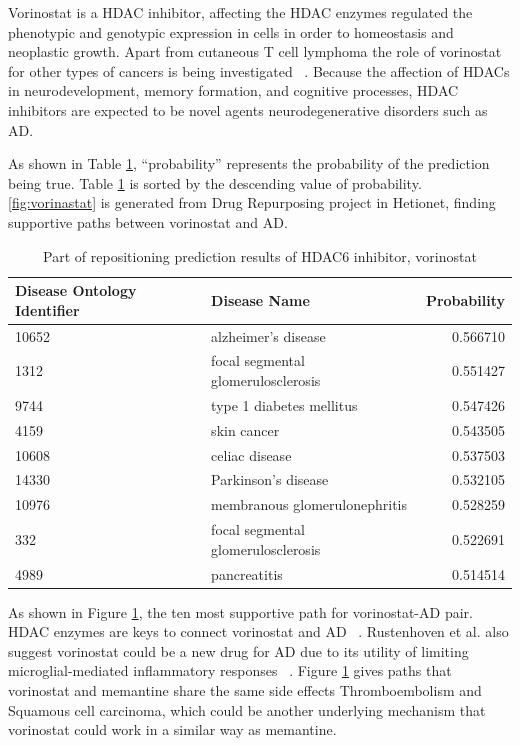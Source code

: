 Vorinostat is a \ac{HDAC} inhibitor, affecting the \ac{HDAC} enzymes regulated the phenotypic and genotypic expression in cells in order to homeostasis and neoplastic growth. Apart from cutaneous T cell lymphoma the role of vorinostat for other types of cancers is being investigated ~\cite{bubna_vorinostat-overview_2015}. Because the affection of \ac{HDAC}s in neurodevelopment, memory formation, and cognitive processes, \ac{HDAC} inhibitors are expected to be novel agents neurodegenerative disorders such as \ac{AD}.

As shown in Table \ref{tab:vorinostat}, “probability” represents the probability of the prediction being true. Table \ref{tab:vorinostat} is sorted by the descending value of probability. \ref{fig:vorinastat} is generated from Drug Repurposing project in Hetionet, finding supportive paths between vorinostat and \ac{AD}.

\begin{table}[!ht]
    \centering
    \begin{tabular}{|p{4cm}|l|r|}
        \hline
        \textbf{Disease Ontology Identifier} & \textbf{Disease Name} & \textbf{Probability}\\
        \hline
        10652 & alzheimer's disease & 0.566710 \\
        \hline
        1312 & focal segmental glomerulosclerosis & 0.551427 \\
        \hline
        9744 & type 1 diabetes mellitus & 0.547426 \\
        \hline
        4159 & skin cancer & 0.543505 \\
        \hline
        10608 & celiac disease & 0.537503 \\
        \hline
        14330 & Parkinson's disease & 0.532105 \\
        \hline
        10976 & membranous glomerulonephritis & 0.528259 \\
        \hline
        332 & focal segmental glomerulosclerosis & 0.522691 \\
        \hline
        4989 & pancreatitis & 0.514514 \\
        \hline
    \end{tabular}
    \captionsetup{justification=centering}
    \caption{Part of repositioning prediction results of HDAC6 inhibitor, vorinostat}
    \label{tab:vorinostat}
\end{table}

As shown in Figure \ref{tab:vorinostat}, the ten most supportive path for vorinostat-\ac{AD} pair. \ac{HDAC} enzymes are keys to connect vorinostat and \ac{AD} ~\cite{desimone_histone_2019}. Rustenhoven et al. also suggest vorinostat could be a new drug for \ac{AD} due to its utility of limiting microglial-mediated inflammatory responses ~\cite{rustenhoven_pu.1_2018}. Figure \ref{tab:vorinostat} gives paths that vorinostat and memantine share the same side effects Thromboembolism and Squamous cell carcinoma, which could be another underlying mechanism that vorinostat could work in a similar way as memantine.


